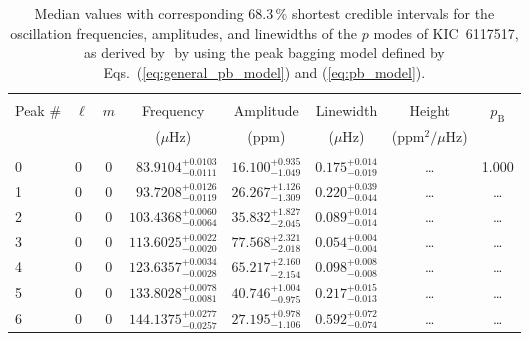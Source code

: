 \begin{table*}[!]
\caption{Median values with corresponding 68.3\,\% shortest credible intervals for the oscillation frequencies, amplitudes, and linewidths of the $p$ modes of KIC~6117517, as derived by \diamonds\,\,by using the peak bagging model defined by Eqs.~(\ref{eq:general_pb_model}) and (\ref{eq:pb_model}).}
\label{tab:6117517p}
\centering
\begin{tabular}{llcrrlrc}
\hline\hline
\\[-8pt]          
Peak \# & $\ell$ & $m$ & \multicolumn{1}{c}{Frequency} & \multicolumn{1}{c}{Amplitude} & \multicolumn{1}{c}{Linewidth} & \multicolumn{1}{c}{Height}& $p_\mathrm{B}$\\
 & & & \multicolumn{1}{c}{($\mu$Hz)} & \multicolumn{1}{c}{(ppm)} & \multicolumn{1}{c}{($\mu$Hz)} & \multicolumn{1}{c}{(ppm$^2/\mu$Hz)}\\
\hline \\[-8pt]
0 & 0 & 0 & $     83.9104_{-      0.0111}^{+      0.0103}$ & $      16.100_{-       1.049}^{+       0.935}$ & $       0.175_{-       0.019}^{+       0.014}$ & \multicolumn{1}{c}{\dots} & 1.000\\[1pt]
1 & 0 & 0 & $     93.7208_{-      0.0119}^{+      0.0126}$ & $      26.267_{-       1.309}^{+       1.126}$ & $       0.220_{-       0.044}^{+       0.039}$ & \multicolumn{1}{c}{\dots} & \dots \\[1pt]
2 & 0 & 0 & $    103.4368_{-      0.0064}^{+      0.0060}$ & $      35.832_{-       2.045}^{+       1.827}$ & $       0.089_{-       0.014}^{+       0.014}$ & \multicolumn{1}{c}{\dots} & \dots \\[1pt]
3 & 0 & 0 & $    113.6025_{-      0.0020}^{+      0.0022}$ & $      77.568_{-       2.018}^{+       2.321}$ & $       0.054_{-       0.004}^{+       0.004}$ & \multicolumn{1}{c}{\dots} & \dots\\[1pt]
4 & 0 & 0 & $    123.6357_{-      0.0028}^{+      0.0034}$ & $      65.217_{-       2.154}^{+       2.160}$ & $       0.098_{-       0.008}^{+       0.008}$ & \multicolumn{1}{c}{\dots} & \dots \\[1pt]
5 & 0 & 0 & $    133.8028_{-      0.0081}^{+      0.0078}$ & $      40.746_{-       0.975}^{+       1.004}$ & $       0.217_{-       0.013}^{+       0.015}$ & \multicolumn{1}{c}{\dots} & \dots \\[1pt]
6 & 0 & 0 & $    144.1375_{-      0.0257}^{+      0.0277}$ & $      27.195_{-       1.106}^{+       0.978}$ & $       0.592_{-       0.074}^{+       0.072}$ & \multicolumn{1}{c}{\dots} & \dots \\[1pt]

\end{tabular}
\end{table*}
